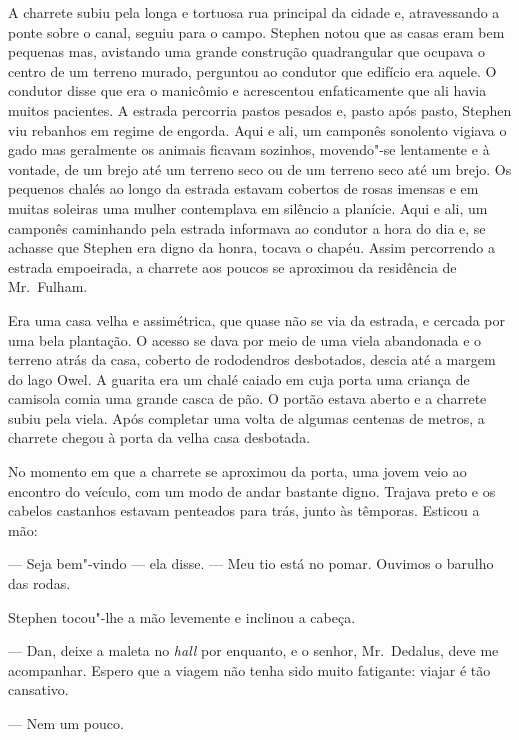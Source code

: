 A charrete subiu pela longa e tortuosa rua principal da cidade e,
atravessando a ponte sobre o canal, seguiu para o campo.  Stephen notou
que as casas eram bem pequenas mas, avistando uma grande construção
quadrangular que ocupava o centro de um terreno murado, perguntou ao
condutor que edifício era aquele.  O condutor disse que era o manicômio
e acrescentou enfaticamente que ali havia muitos pacientes.  A estrada
percorria pastos pesados e, pasto após pasto, Stephen viu rebanhos em
regime de engorda.  Aqui e ali, um camponês sonolento vigiava o gado
mas geralmente os animais ficavam sozinhos, movendo"-se lentamente e à
vontade, de um brejo até um terreno seco ou de um terreno seco até um
brejo.  Os pequenos chalés ao longo da estrada estavam cobertos de
rosas imensas e em muitas soleiras uma mulher contemplava em silêncio a
planície.  Aqui e ali, um camponês caminhando pela estrada informava ao
condutor a hora do dia e, se achasse que Stephen era digno da honra,
tocava o chapéu.  Assim percorrendo a estrada empoeirada, a charrete
aos poucos se aproximou da residência de Mr.~Fulham.

Era uma casa velha e assimétrica, que quase não se via da estrada, e
cercada por uma bela plantação.  O acesso se dava por meio de uma viela
abandonada e o terreno atrás da casa, coberto de rododendros
desbotados, descia até a margem do lago Owel.  A guarita era um chalé
caiado em cuja porta uma criança de camisola comia uma grande casca de
pão.  O portão estava aberto e a charrete subiu pela viela.  Após
completar uma volta de algumas centenas de metros, a charrete chegou à
porta da velha casa desbotada.

No momento em que a charrete se aproximou da porta, uma jovem veio
ao encontro do veículo, com um modo de andar bastante digno.  Trajava
preto e os cabelos castanhos estavam penteados para trás, junto às
têmporas.  Esticou a mão:

--- Seja bem"-vindo --- ela disse.  --- Meu tio está no pomar. 
Ouvimos o barulho das rodas.

Stephen tocou"-lhe a mão levemente e inclinou a cabeça.

--- Dan, deixe a maleta no \textit{hall} por enquanto, e o
senhor, Mr.~Dedalus, deve me acompanhar.  Espero que a viagem não
tenha sido muito fatigante: viajar é tão cansativo.

--- Nem um pouco.

